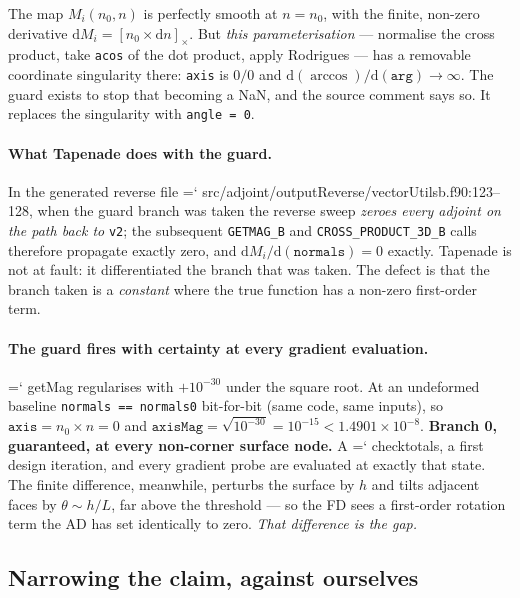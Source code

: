 \documentclass[11pt,a4paper]{article}
\newcommand{\artifact}[1]{{\small\ttfamily\hyphenchar\font=`\-\relax
  \def\_{\textunderscore\allowbreak}#1}}
\begin{document}
The map \(M_i(n_0, n)\) is perfectly smooth at \(n = n_0\), with the finite, non-zero
derivative \(\mathrm{d}M_i = [n_0\times \mathrm{d}n]_\times\). But \emph{this
parameterisation} --- normalise the cross product, take \texttt{acos} of the dot product,
apply Rodrigues --- has a removable coordinate singularity there: \texttt{axis} is \(0/0\)
and \(\mathrm{d}(\arccos)/\mathrm{d}(\texttt{arg}) \rightarrow \infty\). The guard exists to
stop that becoming a NaN, and the source comment says so. It replaces the singularity with
\texttt{angle = 0}.

\paragraph{What Tapenade does with the guard.} In the generated reverse file
\artifact{src/adjoint/outputReverse/vectorUtils\_b.f90:123--128}, when the guard branch was
taken the reverse sweep \emph{zeroes every adjoint on the path back to} \texttt{v2}; the
subsequent \texttt{GETMAG\_B} and \texttt{CROSS\_PRODUCT\_3D\_B} calls therefore propagate
exactly zero, and \(\mathrm{d}M_i/\mathrm{d}(\texttt{normals}) = 0\) exactly. Tapenade is not
at fault: it differentiated the branch that was taken. The defect is that the branch taken is
a \emph{constant} where the true function has a non-zero first-order term.

\paragraph{The guard fires with certainty at every gradient evaluation.} \artifact{getMag}
regularises with \(+10^{-30}\) under the square root. At an undeformed baseline
\texttt{normals == normals0} bit-for-bit (same code, same inputs), so
\(\texttt{axis} = n_0\times n = 0\) and \(\texttt{axisMag} = \sqrt{10^{-30}} = 10^{-15} <
1.4901\times10^{-8}\). \textbf{Branch 0, guaranteed, at every non-corner surface node.} A
\artifact{check\_totals}, a first design iteration, and every gradient probe are evaluated at
exactly that state. The finite difference, meanwhile, perturbs the surface by \(h\) and tilts
adjacent faces by \(\theta\sim h/L\), far above the threshold --- so the FD sees a
first-order rotation term the AD has set identically to zero. \emph{That difference is the
gap.}

\subsection{Narrowing the claim, against ourselves}
\end{document}
